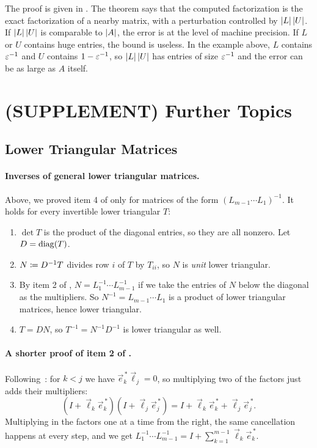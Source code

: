 The proof is given in . The theorem says that the computed factorization is the exact factorization of a nearby matrix, with a perturbation controlled by $\left\lvert L \right\rvert\left\lvert U \right\rvert$. If $\left\lvert L \right\rvert\left\lvert U \right\rvert$ is comparable to $\left\lvert A \right\rvert$, the error is at the level of machine precision. If $L$ or $U$ contains huge entries, the bound is useless. In the example above, $L$ contains $\varepsilon^{-1}$ and $U$ contains $1 - \varepsilon^{-1}$, so $\left\lvert L \right\rvert\left\lvert U \right\rvert$ has entries of size $\varepsilon^{-1}$ and the error can be as large as $A$ itself.

\section{(SUPPLEMENT) Further Topics}
\label{sec:lu-supp}
\subsection{Lower Triangular Matrices}

\paragraph{Inverses of general lower triangular matrices.} Above, we proved item 4 of  only for matrices of the form $(L_{m-1} \cdots L_1)^{-1}$. It holds for every invertible lower triangular $T$:
\begin{enumerate}
  \item $\det T$ is the product of the diagonal entries, so they are all nonzero. Let $D = \operatorname{diag}(T)$.
  \item $N \coloneqq D^{-1}T$ divides row $i$ of $T$ by $T_{ii}$, so $N$ is \emph{unit} lower triangular.
  \item By item 2 of , $N = L_1^{-1} \cdots L_{m-1}^{-1}$ if we take the entries of $N$ below the diagonal as the multipliers. So $N^{-1} = L_{m-1} \cdots L_1$ is a product of lower triangular matrices, hence lower triangular.
  \item $T = DN$, so $T^{-1} = N^{-1}D^{-1}$ is lower triangular as well.
\end{enumerate}

\paragraph{A shorter proof of item 2 of .} Following~\cite[Lecture 20]{TB}: for $k < j$ we have $\vec{e}_k^{\,\ast}\vec{\ell}_j = 0$, so multiplying two of the factors just adds their multipliers:
\begin{equation}
  (I + \vec{\ell}_k\vec{e}_k^{\,\ast})(I + \vec{\ell}_j\vec{e}_j^{\,\ast}) = I + \vec{\ell}_k\vec{e}_k^{\,\ast} + \vec{\ell}_j\vec{e}_j^{\,\ast}.
\end{equation}
Multiplying in the factors one at a time from the right, the same cancellation happens at every step, and we get $L_1^{-1} \cdots L_{m-1}^{-1} = I + \sum_{k=1}^{m-1}\vec{\ell}_k\vec{e}_k^{\,\ast}$.

